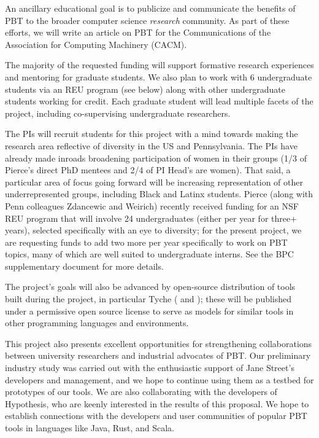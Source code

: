 An ancillary educational goal is to
publicize and communicate the benefits of PBT to the broader computer science
{\em research} community. As part of these efforts, we will write an article on PBT
for the Communications of the Association for Computing Machinery
(CACM).

\smallskip
{}
%
The majority of the requested funding will support formative research
experiences and mentoring for graduate students. We
also plan to work with 6 undergraduate students via an
REU program (see below) along with other
undergraduate students working for credit. Each graduate
student will lead multiple facets of the
project, including co-supervising undergraduate
researchers.

The PIs will recruit students for this project with a mind towards making
the research area reflective of diversity in the US and Pennsylvania.
The PIs have already made inroads broadening participation of women in their
groups (1/3 of Pierce's direct PhD mentees and 2/4 of PI
Head's are women). That said, a particular area of focus going forward
will be increasing representation of
other underrepresented groups, including Black and Latinx
students. Pierce (along with Penn colleagues Zdancewic and Weirich)
recently received funding for an
NSF REU program that will involve 24 undergraduates (either per
year for three+ years), selected specifically with an eye to diversity;
for the present project, we are requesting funds to add two more per
year specifically to work on PBT topics, many of which are well suited
to undergraduate interns. See the BPC
supplementary
document for more details.

\smallskip
{}
%
The project's goals will also be advanced by open-source distribution of tools
built during the project, in particular Tyche
( and
); these will be published under a permissive
open source license to serve as models for similar tools in other
programming languages and environments.

This project also presents excellent opportunities for strengthening
collaborations between university researchers and industrial advocates
of PBT.  Our preliminary industry study was carried out with the
enthusiastic support of Jane Street's developers and management, and we hope
to continue using them as a testbed for prototypes of our
tools.  We are also collaborating with the
developers of Hypothesis, who are keenly
interested in the results of this proposal.
We hope to establish connections with the
developers and user communities of popular PBT tools in languages like
Java, Rust, and Scala.

